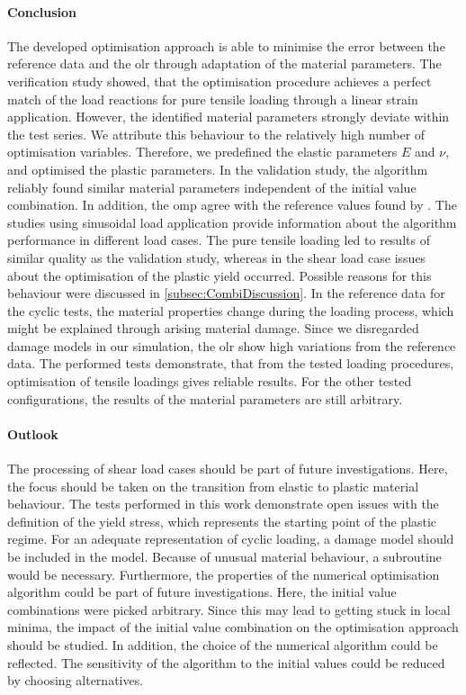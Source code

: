 \paragraph{Conclusion}
The developed optimisation approach is able to minimise the error between the reference data and the \acrlong{olr} through adaptation of the material parameters. The verification study showed, that the optimisation procedure achieves a perfect match of the load reactions for pure tensile loading through a linear strain application. However, the identified material parameters strongly deviate within the test series. We attribute this behaviour to the relatively high number of optimisation variables. Therefore, we predefined the elastic parameters $E$ and $\nu$, and optimised the plastic parameters.  In the validation study, the algorithm reliably found similar material parameters independent of the initial value combination. In addition, the \acrlong{omp} agree with the reference values found by \citet{ries_deciphering_nodate}.
The studies using sinusoidal load application provide information about the algorithm performance in different load cases. The pure tensile loading led to results of similar quality as the validation study, whereas in the shear load case issues about the optimisation of the plastic yield occurred.
Possible reasons for this behaviour were discussed in \autoref{subsec:CombiDiscussion}. In the reference data for the cyclic tests, the material properties change during the loading process, which might be explained through arising material damage. Since we disregarded damage models in our  simulation, the \acrlong{olr} show high variations from the reference data. The performed tests demonstrate, that from the tested loading procedures, optimisation of tensile loadings gives reliable results. For the other tested configurations, the results of the material parameters are still arbitrary.


\paragraph{Outlook}
The processing of shear load cases should be part of future investigations. Here, the focus should be taken on the transition from elastic to plastic material behaviour.
The tests performed in this work demonstrate open issues with the definition of the yield stress, which represents the starting point of the plastic regime. 
For an adequate representation of cyclic loading, a damage model should be included in the  model.
Because of unusual material behaviour, a subroutine would be necessary. 
Furthermore, the properties of the numerical optimisation algorithm could be part of future investigations.
Here, the initial value combinations were picked arbitrary.
Since this may lead to getting stuck in local minima, the impact of the initial value combination on the optimisation approach should be studied. In addition, the choice of the numerical algorithm could be reflected.
The sensitivity of the algorithm to the initial values could be reduced by choosing alternatives. 

